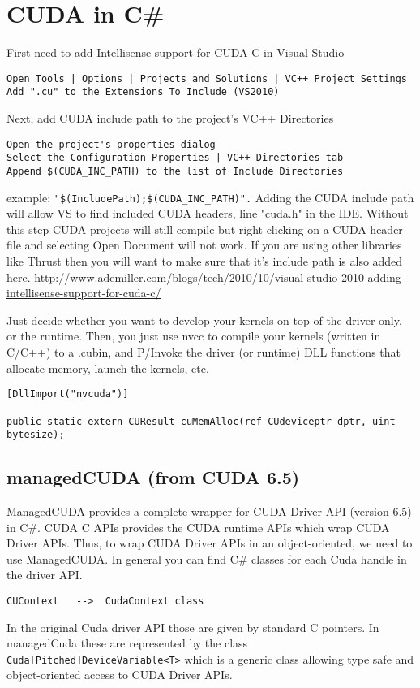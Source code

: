 \chapter{CUDA in C\#}
\label{chap:CUDA_Csharp}

First need to add Intellisense support for CUDA C in Visual Studio
\begin{verbatim}
Open Tools | Options | Projects and Solutions | VC++ Project Settings
Add ".cu" to the Extensions To Include (VS2010)
\end{verbatim}
Next, add CUDA include path to the project's VC++ Directories
\begin{verbatim}
Open the project's properties dialog
Select the Configuration Properties | VC++ Directories tab
Append $(CUDA_INC_PATH) to the list of Include Directories
\end{verbatim}
example: \verb!"$(IncludePath);$(CUDA_INC_PATH)".! Adding the CUDA include path
will allow VS to find included CUDA headers, line "cuda.h" in the IDE. Without
this step CUDA projects will still compile but right clicking on a CUDA header
file and selecting Open Document will not work. If you are using other libraries
like Thrust then you will want to make sure that it's include path is also added
here.   
\url{http://www.ademiller.com/blogs/tech/2010/10/visual-studio-2010-adding-intellisense-support-for-cuda-c/}

Just decide whether you want to develop your kernels on top of the driver only,
or the runtime. Then, you just use nvcc to compile your kernels (written in
C/C++) to a .cubin, and P/Invoke the driver (or runtime) DLL functions that
allocate memory, launch the kernels, etc.
\begin{verbatim}
[DllImport("nvcuda")]

public static extern CUResult cuMemAlloc(ref CUdeviceptr dptr, uint bytesize);
\end{verbatim}  

\section{managedCUDA (from CUDA 6.5)}
\label{sec:managedCUDA}

ManagedCUDA provides a complete wrapper for CUDA Driver API (version 6.5) in
C\#. CUDA C APIs provides the CUDA runtime APIs which wrap CUDA Driver APIs.
Thus, to wrap CUDA Driver APIs in an object-oriented, we need to use
ManagedCUDA. In general you can find C\# classes for each Cuda handle in the
driver API.
\begin{verbatim}
CUContext   -->  CudaContext class
\end{verbatim}
 In the original Cuda driver API those are given by standard C pointers. In
managedCuda these are represented by the class
\verb!Cuda[Pitched]DeviceVariable<T>! which is a generic class allowing type
safe and object-oriented access to CUDA Driver APIs.


